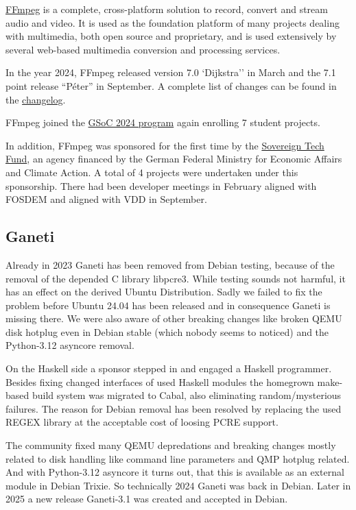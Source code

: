 \documentclass[a4paper]{report}
\begin{document}
\href{https://www.ffmpeg.org}{FFmpeg} is a complete, cross-platform solution to record, convert and stream audio and video. It is used as the foundation platform of many projects dealing with multimedia, both open source and proprietary, and is used extensively by several web-based multimedia conversion and processing services.

In the year 2024, FFmpeg released version 7.0 `Dijkstra'' in March and the 7.1 point release ``Péter'' in September. A complete list of changes can be found in the \href{https://git.ffmpeg.org/gitweb/ffmpeg.git/blob/HEAD:/Changelog}{changelog}.

FFmpeg joined the \href{https://summerofcode.withgoogle.com/programs/2024/organizations/ffmpeg}{GSoC 2024 program} again enrolling 7 student projects.

In addition, FFmpeg was sponsored for the first time by the \href{https://www.sovereign.tech/tech/ffmpeg}{Sovereign Tech Fund}, an agency financed by the German Federal Ministry for Economic Affairs and Climate Action. A total of 4 projects were undertaken under this sponsorship. There had been developer meetings in February aligned with FOSDEM and aligned with VDD in September.

\subsection{Ganeti}

Already in 2023 Ganeti has been removed from Debian testing, because of the removal of the depended C library libpcre3. While testing sounds not harmful, it has an effect on the derived Ubuntu Distribution. Sadly we failed to fix the problem before Ubuntu 24.04 has been released and in consequence Ganeti is missing there. We were also aware of other breaking changes like broken QEMU disk hotplug even in Debian stable (which nobody seems to noticed) and the Python-3.12 asyncore removal.

On the Haskell side a sponsor stepped in and engaged a Haskell programmer. Besides fixing changed interfaces of used Haskell modules the homegrown make-based build system was migrated to Cabal, also eliminating random/mysterious failures. The reason for Debian removal has been resolved by replacing the used REGEX library at the acceptable cost of loosing PCRE support.

The community fixed many QEMU depredations and breaking changes mostly related to disk handling like command line parameters and QMP hotplug related. And with Python-3.12 asyncore it turns out, that this is available as an external module in Debian Trixie. So technically 2024 Ganeti was back in Debian. Later in 2025 a new release Ganeti-3.1 was created and accepted in Debian.
\end{document}

